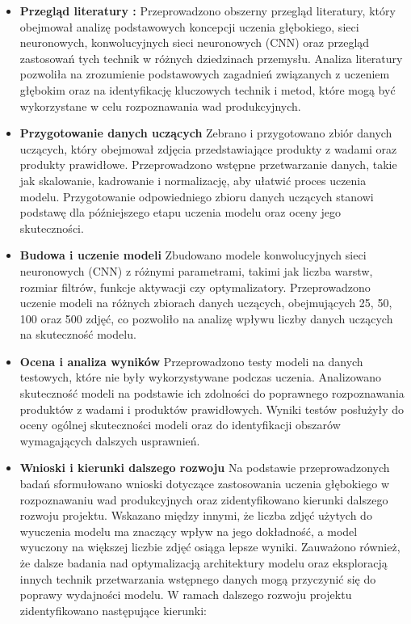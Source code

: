 \begin{itemize}
\item \textbf{Przegląd literatury :} Przeprowadzono obszerny przegląd literatury, który obejmował analizę podstawowych koncepcji uczenia głębokiego, sieci neuronowych, konwolucyjnych sieci neuronowych (CNN) oraz przegląd zastosowań tych technik w różnych dziedzinach przemysłu. Analiza literatury pozwoliła na zrozumienie podstawowych zagadnień związanych z uczeniem głębokim oraz na identyfikację kluczowych technik i metod, które mogą być wykorzystane w celu rozpoznawania wad produkcyjnych.
\item \textbf{Przygotowanie danych uczących}
Zebrano i przygotowano zbiór danych uczących, który obejmował zdjęcia przedstawiające produkty z wadami oraz produkty prawidłowe. Przeprowadzono wstępne przetwarzanie danych, takie jak skalowanie, kadrowanie i normalizację, aby ułatwić proces uczenia modelu. Przygotowanie odpowiedniego zbioru danych uczących stanowi podstawę dla późniejszego etapu uczenia modelu oraz oceny jego skuteczności.
\item \textbf{Budowa i uczenie modeli}
Zbudowano modele konwolucyjnych sieci neuronowych (CNN) z różnymi parametrami, takimi jak liczba warstw, rozmiar filtrów, funkcje aktywacji czy optymalizatory. Przeprowadzono uczenie modeli na różnych zbiorach danych uczących, obejmujących 25, 50, 100 oraz 500 zdjęć, co pozwoliło na analizę wpływu liczby danych uczących na skuteczność modelu.
\item \textbf{Ocena i analiza wyników}
Przeprowadzono testy modeli na danych testowych, które nie były wykorzystywane podczas uczenia. Analizowano skuteczność modeli na podstawie ich zdolności do poprawnego rozpoznawania produktów z wadami i produktów prawidłowych. Wyniki testów posłużyły do oceny ogólnej skuteczności modeli oraz do identyfikacji obszarów wymagających dalszych usprawnień.
\item \textbf{Wnioski i kierunki dalszego rozwoju}
Na podstawie przeprowadzonych badań sformułowano wnioski dotyczące zastosowania uczenia głębokiego w rozpoznawaniu wad produkcyjnych oraz zidentyfikowano kierunki dalszego rozwoju projektu. Wskazano między innymi, że liczba zdjęć użytych do wyuczenia modelu ma znaczący wpływ na jego dokładność, a model wyuczony na większej liczbie zdjęć osiąga lepsze wyniki. Zauważono również, że dalsze badania nad optymalizacją architektury modelu oraz eksploracją innych technik przetwarzania wstępnego danych mogą przyczynić się do poprawy wydajności modelu.
W ramach dalszego rozwoju projektu zidentyfikowano następujące kierunki:

\end{itemize}
